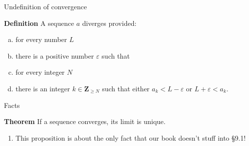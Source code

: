 \documentclass[portrait,fleqn,12pt]{beamer}
\newenvironment{alphalist}
   {\begin{enumerate}[(a)]
       \addtolength{\itemsep}{-1.25\itemsep}}
     {\end{enumerate}}
\newcommand{\integers}{\mathbf{Z}}
\newenvironment{define}[1]{
  \textbf{Definition} #1}{}
\begin{document}
\begin{frame}{Undefinition of convergence}

\begin{define} A sequence \(a\) diverges provided:
\begin{alphalist}
\item for every number \(L\) 
\item there is a positive number \(\varepsilon\) such that
\item for every integer \(N\) 
\item \label{dee} there is an integer \(k \in \integers_{\geq N}\)
such that either \(a_k < L - \varepsilon\) or \(L + \varepsilon < a_k\).
\end{alphalist}


\end{define}

\end{frame}
\begin{frame}{Facts}

\noindent \textbf{Theorem} If a sequence converges, its limit is
unique. 
\begin{enumerate}
\item This proposition is about the only fact that our
book doesn't stuff into \S9.1!
\end{enumerate}


\end{frame}
\end{document}
